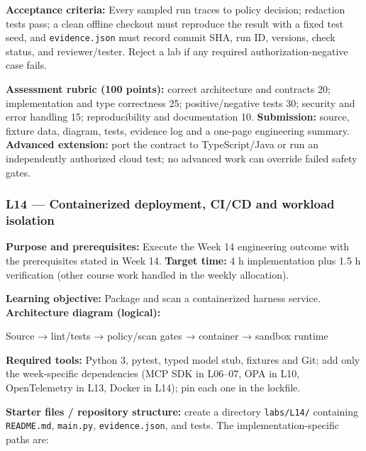 \documentclass[
  10pt,
]{article}
\newenvironment{Shaded}{\begin{snugshade}}{\end{snugshade}}
\newcommand{\NormalTok}[1]{#1}
\begin{document}
\textbf{Acceptance criteria:} Every sampled run traces to policy
decision; redaction tests pass; a clean offline checkout must reproduce
the result with a fixed test seed, and \texttt{evidence.json} must
record commit SHA, run ID, versions, check status, and reviewer/tester.
Reject a lab if any required authorization-negative case fails.

\textbf{Assessment rubric (100 points):} correct architecture and
contracts 20; implementation and type correctness 25; positive/negative
tests 30; security and error handling 15; reproducibility and
documentation 10. \textbf{Submission:} source, fixture data, diagram,
tests, evidence log and a one-page engineering summary. \textbf{Advanced
extension:} port the contract to TypeScript/Java or run an independently
authorized cloud test; no advanced work can override failed safety
gates.

\subsubsection{L14 --- Containerized deployment, CI/CD and workload
isolation}\label{l14-containerized-deployment-cicd-and-workload-isolation}

\textbf{Purpose and prerequisites:} Execute the Week 14 engineering
outcome with the prerequisites stated in Week 14. \textbf{Target time:}
4 h implementation plus 1.5 h verification (other course work handled in
the weekly allocation).

\textbf{Learning objective:} Package and scan a containerized harness
service. \textbf{Architecture diagram (logical):}

\begin{Shaded}
\begin{Highlighting}[]
\NormalTok{Source → lint/tests → policy/scan gates → container →}
\NormalTok{sandbox runtime}
\end{Highlighting}
\end{Shaded}

\textbf{Required tools:} Python 3, pytest, typed model stub, fixtures
and Git; add only the week-specific dependencies (MCP SDK in L06--07,
OPA in L10, OpenTelemetry in L13, Docker in L14); pin each one in the
lockfile.

{\raggedright \textbf{Starter files / repository structure:} create a directory
\texttt{labs/\allowbreak L14/} containing \texttt{README.md}, \texttt{main.py},
\texttt{evidence.json}, and tests. The implementation-specific paths
are:\par}
\end{document}
